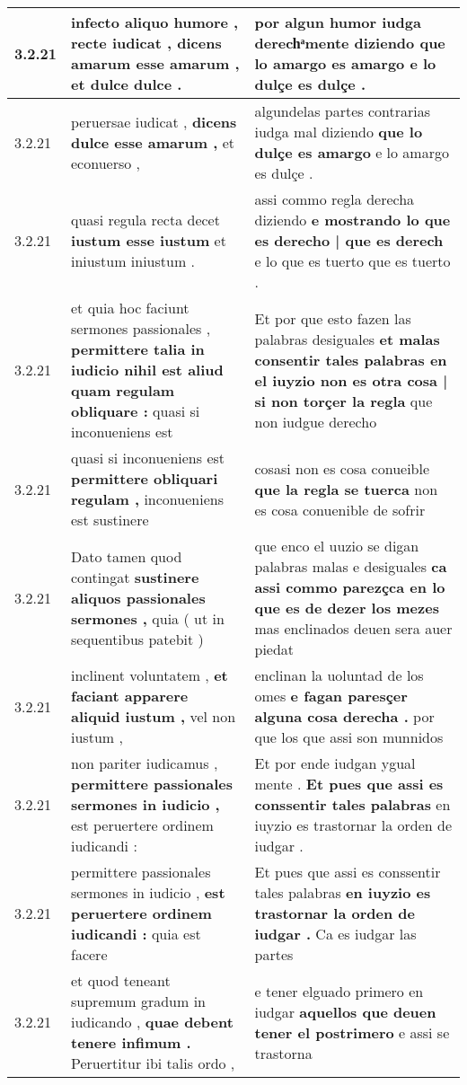 \begin{tabular}{|p{1cm}|p{6.5cm}|p{6.5cm}|}
3.2.21 & infecto aliquo humore , recte iudicat , \textbf{ dicens amarum esse amarum , } et dulce dulce . & por algun humor iudga derechͣmente diziendo \textbf{ que lo amargo es amargo } e lo dulçe es dulçe . \\\hline
3.2.21 & peruersae iudicat , \textbf{ dicens dulce esse amarum , } et econuerso , & algundelas partes contrarias iudga mal diziendo \textbf{ que lo dulçe es amargo } e lo amargo es dulçe . \\\hline
3.2.21 & quasi regula recta decet \textbf{ iustum esse iustum } et iniustum iniustum . & assi commo regla derecha diziendo \textbf{ e mostrando lo que es derecho | que es derech } e lo que es tuerto que es tuerto . \\\hline
3.2.21 & et quia hoc faciunt sermones passionales , \textbf{ permittere talia in iudicio nihil est aliud quam regulam obliquare : } quasi si inconueniens est & Et por que esto fazen las palabras desiguales \textbf{ et malas consentir tales palabras en el iuyzio non es otra cosa | si non torçer la regla } que non iudgue derecho \\\hline
3.2.21 & quasi si inconueniens est \textbf{ permittere obliquari regulam , } inconueniens est sustinere & cosasi non es cosa conueible \textbf{ que la regla se tuerca } non es cosa conuenible de sofrir \\\hline
3.2.21 & Dato tamen quod contingat \textbf{ sustinere aliquos passionales sermones , } quia ( ut in sequentibus patebit ) & que enco el uuzio se digan palabras malas e desiguales \textbf{ ca assi commo parezçca en lo que es de dezer los mezes } mas enclinados deuen sera auer piedat \\\hline
3.2.21 & inclinent voluntatem , \textbf{ et faciant apparere aliquid iustum , } vel non iustum , & enclinan la uoluntad de los omes \textbf{ e fagan paresçer alguna cosa derecha . } por que los que assi son munnidos \\\hline
3.2.21 & non pariter iudicamus , \textbf{ permittere passionales sermones in iudicio , } est peruertere ordinem iudicandi : & Et por ende iudgan ygual mente . \textbf{ Et pues que assi es conssentir tales palabras } en iuyzio es trastornar la orden de iudgar . \\\hline
3.2.21 & permittere passionales sermones in iudicio , \textbf{ est peruertere ordinem iudicandi : } quia est facere & Et pues que assi es conssentir tales palabras \textbf{ en iuyzio es trastornar la orden de iudgar . } Ca es iudgar las partes \\\hline
3.2.21 & et quod teneant supremum gradum in iudicando , \textbf{ quae debent tenere infimum . } Peruertitur ibi talis ordo , & e tener elguado primero en iudgar \textbf{ aquellos que deuen tener el postrimero } e assi se trastorna \\\hline

\end{tabular}

